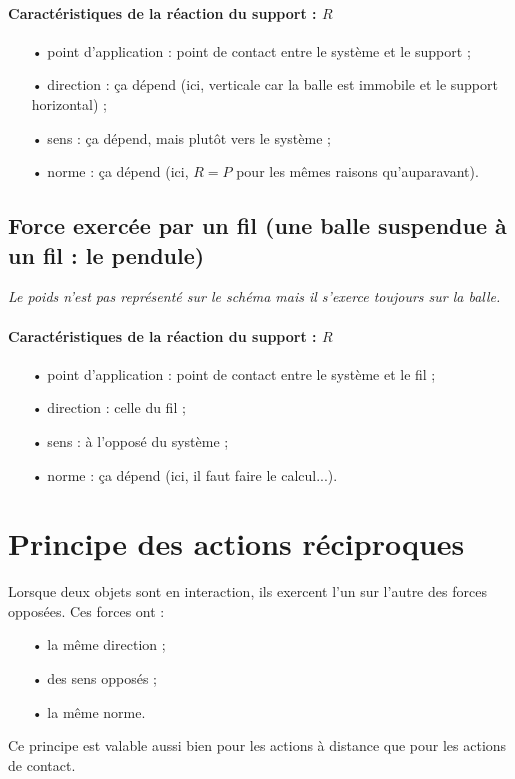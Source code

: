 \documentclass[12pt,a4paper,fleqn]{article}
\begin{document}
\paragraph{Caractéristiques de la réaction du support : $R$}
\begin{itemize}
\item[•] point d'application : point de contact entre le système et le support ;
\item[•] direction : ça dépend (ici, verticale car la balle est immobile et le support horizontal) ;
\item[•] sens : ça dépend, mais plutôt vers le système ;
\item[•] norme : ça dépend (ici, $R=P$ pour les mêmes raisons qu'auparavant).
\end{itemize}

\subsection{Force exercée par un fil (une balle suspendue à un fil : le pendule)}

\begin{center}
\end{center}

\emph{Le poids n'est pas représenté sur le schéma mais il s'exerce toujours sur la balle.}

\paragraph{Caractéristiques de la réaction du support : $R$}
\begin{itemize}
\item[•] point d'application : point de contact entre le système et le fil ;
\item[•] direction : celle du fil ;
\item[•] sens : à l'opposé du système ;
\item[•] norme : ça dépend (ici, il faut faire le calcul...).
\end{itemize}

\section{Principe des actions réciproques}

Lorsque deux objets sont en interaction, ils exercent l'un sur l'autre des forces opposées.
Ces forces ont : 
\begin{itemize}
\item[•] la même direction ;
\item[•] des sens opposés ;
\item[•] la même norme.
\end{itemize}
Ce principe est valable aussi bien pour les actions à distance que pour les actions de contact.
\end{document}
